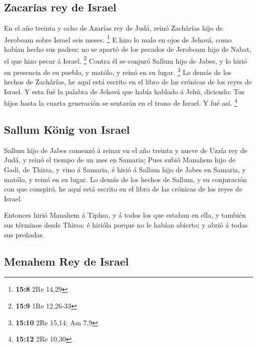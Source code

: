 \hypertarget{zacaruxedas-rey-de-israel}{%
\subsection{Zacarías rey de Israel}\label{zacaruxedas-rey-de-israel}}

 En el año treinta y ocho de Azarías rey de Judá, reinó
Zachârías hijo de Jeroboam sobre Israel seis meses. \footnote{\textbf{15:8}
  2Re 14,29}  E hizo lo malo en ojos de Jehová, como
habían hecho sus padres: no se apartó de los pecados de Jeroboam hijo de
Nabat, el que hizo pecar á Israel. \footnote{\textbf{15:9} 1Re 12,26-33}
 Contra él se conjuró Sallum hijo de Jabes, y lo hirió en
presencia de su pueblo, y matólo, y reinó en su lugar. \footnote{\textbf{15:10}
  2Re 15,14; Am 7,9}  Lo demás de los hechos de
Zachârías, he aquí está escrito en el libro de las crónicas de los reyes
de Israel.  Y esta fué la palabra de Jehová que había
hablado á Jehú, diciendo: Tus hijos hasta la cuarta generación se
sentarán en el trono de Israel. Y fué así. \footnote{\textbf{15:12} 2Re
  10,30}

\hypertarget{sallum-kuxf6nig-von-israel}{%
\subsection{Sallum König von Israel}\label{sallum-kuxf6nig-von-israel}}

 Sallum hijo de Jabes comenzó á reinar en el año treinta
y nueve de Uzzía rey de Judá, y reinó el tiempo de un mes en Samaria;
 Pues subió Manahem hijo de Gadi, de Thirsa, y vino á
Samaria, é hirió á Sallum hijo de Jabes en Samaria, y matólo, y reinó en
su lugar.  Lo demás de los hechos de Sallum, y su
conjuración con que conspiró, he aquí está escrito en el libro de las
crónicas de los reyes de Israel.

 Entonces hirió Manahem á Tiphsa, y á todos los que
estaban en ella, y también sus términos desde Thirsa; é hirióla porque
no le habían abierto; y abrió á todas sus preñadas.

\hypertarget{menahem-rey-de-israel}{%
\subsection{Menahem Rey de Israel}\label{menahem-rey-de-israel}}

